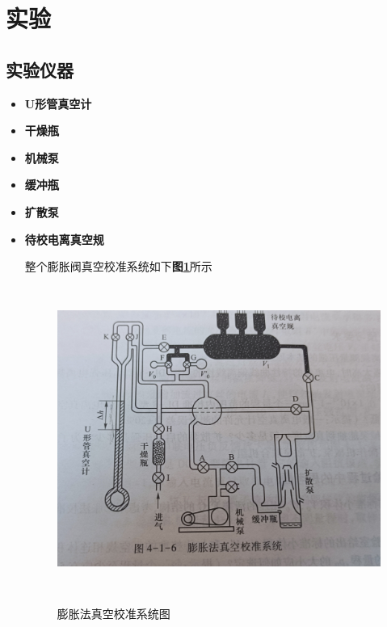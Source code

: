 \documentclass[a4paper]{article}
\begin{document}
\section{实验} \label{experiment}%

\subsection{实验仪器}\label{sub:sysover}
\begin{itemize}
\item{\textbf{U形管真空计}}
\item{\textbf{干燥瓶}}
\item{\textbf{机械泵}}
\item{\textbf{缓冲瓶}}
\item{\textbf{扩散泵}}
\item{\textbf{待校电离真空规}}

整个膨胀阀真空校准系统如下\textbf{图\ref{fig:fig2}}所示
\begin{figure}[H]
 \centering
 \caption{膨胀法真空校准系统图}
 \includegraphics[height=10cm, width=14cm]{images/pic2.jpg}
 \label{fig:fig2}
\end{figure}
\end{itemize}
\end{document}
